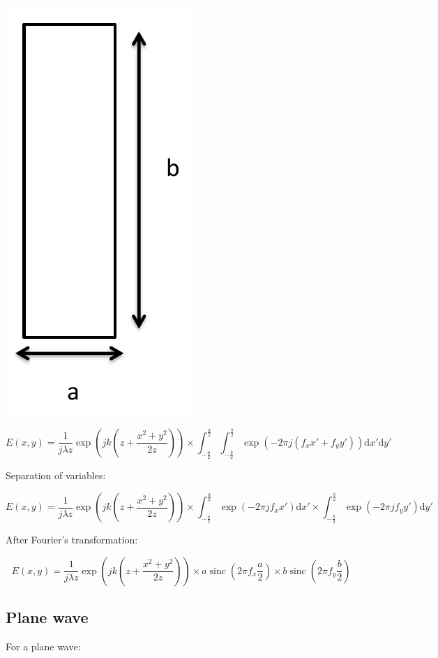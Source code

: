 \documentclass[10pt,a4paper]{article}
\DeclareMathOperator{\sinc}{sinc}
\begin{document}
\begin{center}
\includegraphics[scale=0.3]{./figures/schema-4-1.png}
\end{center}

\[
E(x,y)=\frac{1}{j\lambda z} \exp\left(jk\left(z+\frac{x^2+y^2}{2z}\right)\right)
\times \int_{-\frac{a}{2}}^\frac{a}{2} \int_{-\frac{b}{2}}^\frac{b}{2}
 \exp\left(-2\pi j(f_xx'+f_yy')\right)\mathrm{d}x'\mathrm{d}y'
\]

Separation of variables:

\[
E(x,y)=\frac{1}{j\lambda z} \exp\left(jk\left(z+\frac{x^2+y^2}{2z}\right)\right)
\times \int_{-\frac{a}{2}}^\frac{a}{2} \exp\left(-2\pi jf_xx'\right)\mathrm{d}x'
\times \int_{-\frac{b}{2}}^\frac{b}{2} \exp\left(-2\pi jf_yy'\right)\mathrm{d}y'
\]

After Fourier’s transformation:

\[
E(x,y)=\frac{1}{j\lambda z} \exp\left(jk\left(z+\frac{x^2+y^2}{2z}\right)\right)
\times a\sinc\left(2\pi f_x \frac{a}{2}\right)
\times b\sinc\left(2\pi f_y \frac{b}{2}\right)
\]

	\subsection{Plane wave}
For a plane wave:
\end{document}
